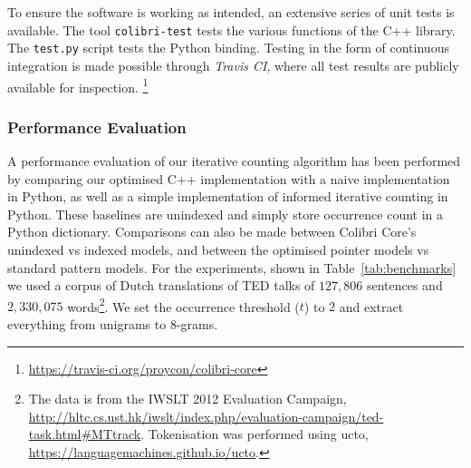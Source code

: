 \documentclass[a4paper,12pt]{article}
\begin{document}
To ensure the software is working as intended, an extensive series of unit
tests is available.  The tool \texttt{colibri-test} tests the various functions
of the C++ library. The \texttt{test.py} script tests the Python binding.
Testing in the form of continuous integration is made possible through
\emph{Travis CI}, where all test results are publicly available for inspection.
\footnote{\url{https://travis-ci.org/proycon/colibri-core}}

\subsubsection{Performance Evaluation}

A performance evaluation of our iterative counting algorithm has been performed
by comparing our optimised C++ implementation with a naive implementation in
Python, as well as a simple implementation of informed iterative counting in
Python. These baselines are unindexed and simply store occurrence count in a
Python dictionary. Comparisons can also be made between Colibri Core's
unindexed vs indexed models, and between the optimised pointer models vs
standard pattern models.  For the experiments, shown in
Table~\ref{tab:benchmarks} we used a corpus of Dutch
translations of TED talks of $127,806$ sentences and $2,330,075$
words\footnote{The data is from the IWSLT 2012 Evaluation Campaign,
    \url{http://hltc.cs.ust.hk/iwslt/index.php/evaluation-campaign/ted-task.html\#MTtrack}.
Tokenisation was performed using ucto, \url{https://languagemachines.github.io/ucto}.}. We set
the occurrence threshold ($t$) to $2$ and extract everything from unigrams to
$8$-grams. 
\end{document}
